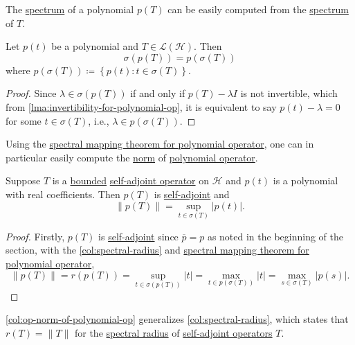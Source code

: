 The \hyperref[def:spectrum-point]{spectrum} of a polynomial \(p(T)\) can be easily computed from the \hyperref[def:spectrum-point]{spectrum} of \(T\).

\begin{theorem}\label{thm:spectral-mapping-for-polynomial-op}
	Let \(p(t)\) be a polynomial and \(T\in \mathcal{L} (\mathcal{H} )\). Then
	\[
		\sigma (p(T)) = p(\sigma (T))
	\]
	where \(p(\sigma (T)) \coloneqq \left\{ p(t) \colon t\in \sigma (T) \right\} \).
\end{theorem}
\begin{proof}
	Since \(\lambda \in \sigma (p(T))\) if and only if \(p(T) - \lambda I\) is not invertible, which from \autoref{lma:invertibility-for-polynomial-op}, it is equivalent to say \(p(t) - \lambda = 0\) for some \(t\in \sigma (T)\), i.e., \(\lambda \in p(\sigma (T))\).
\end{proof}

Using the \hyperref[thm:spectral-mapping-for-polynomial-op]{spectral mapping theorem for polynomial operator}, one can in particular easily compute the \hyperref[def:norm]{norm} of \hyperref[def:polynomial-op]{polynomial operator}.

\begin{corollary}\label{col:op-norm-of-polynomial-op}
	Suppose \(T\) is a \hyperref[rmk:bounded-op]{bounded} \hyperref[def:self-adjoint-op]{self-adjoint operator} on \(\mathcal{H} \) and \(p(t)\) is a polynomial with real coefficients. Then \(p(T)\) is \hyperref[def:self-adjoint-op]{self-adjoint} and
	\[
		\lVert p(T) \rVert = \sup _{t\in \sigma (T)}\vert p(t) \vert.
	\]
\end{corollary}
\begin{proof}
	Firstly, \(p(T)\) is \hyperref[def:self-adjoint-op]{self-adjoint} since \(\overline{p} = p\) as noted in the beginning of the section, with the \autoref{col:spectral-radius} and \hyperref[thm:spectral-mapping-for-polynomial-op]{spectral mapping theorem for polynomial operator},
	\[
		\lVert p(T) \rVert = r(p(T)) = \sup _{t\in \sigma (p(T))} \vert t \vert = \max _{t\in p(\sigma (T))} \vert t \vert = \max _{s\in \sigma (T)} \vert p(s) \vert .
	\]
\end{proof}

\autoref{col:op-norm-of-polynomial-op} generalizes \autoref{col:spectral-radius}, which states that \(r(T) = \lVert T \rVert \) for the \hyperref[def:spectral-radius]{spectral radius} of \hyperref[def:self-adjoint-op]{self-adjoint operators} \(T\).
